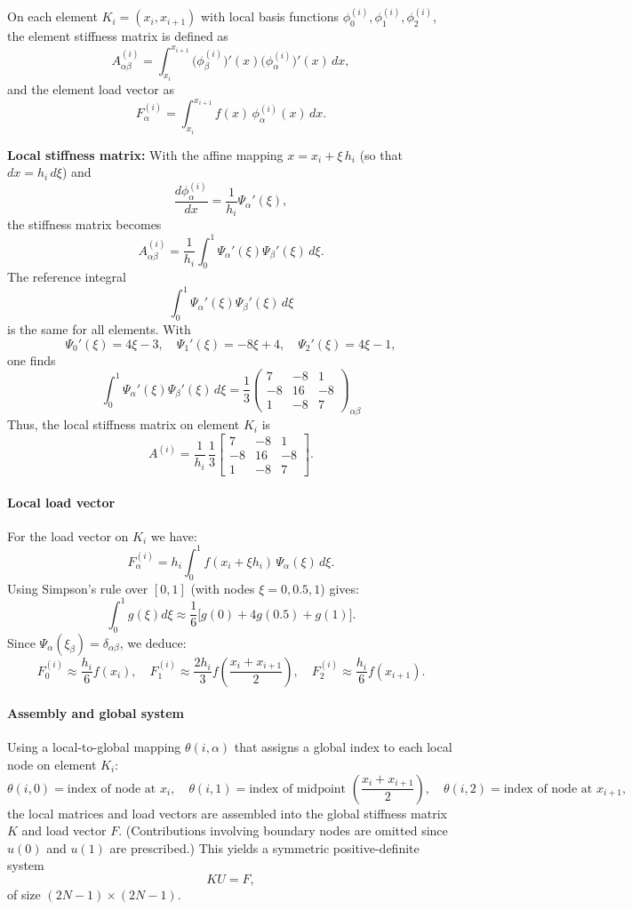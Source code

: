 \documentclass[a4paper,10pt]{report}
\begin{document}
On each element \(K_i=(x_i,x_{i+1})\) with local basis functions \(\phi_0^{(i)},\phi_1^{(i)},\phi_2^{(i)}\), the element stiffness matrix is defined as
\[
	A^{(i)}_{\alpha\beta}=\int_{x_i}^{x_{i+1}} \big(\phi_\beta^{(i)}\big)'(x) \big(\phi_\alpha^{(i)}\big)'(x)\,dx,
\]
and the element load vector as
\[
	F^{(i)}_\alpha=\int_{x_i}^{x_{i+1}} f(x)\,\phi_\alpha^{(i)}(x)\,dx.
\]

\textbf{Local stiffness matrix:} With the affine mapping \(x=x_i+\xi\,h_i\) (so that \(dx=h_i\,d\xi\)) and
\[
	\frac{d\phi_\alpha^{(i)}}{dx}=\frac{1}{h_i}\Psi_\alpha'(\xi),
\]
the stiffness matrix becomes
\[
	A^{(i)}_{\alpha\beta}=\frac{1}{h_i}\int_0^1 \Psi_\alpha'(\xi)\Psi_\beta'(\xi)\,d\xi.
\]
The reference integral
\[
	\int_0^1 \Psi_\alpha'(\xi)\Psi_\beta'(\xi)\,d\xi
\]
is the same for all elements. With
\[
	\Psi_0'(\xi)=4\xi-3,\quad \Psi_1'(\xi)=-8\xi+4,\quad \Psi_2'(\xi)=4\xi-1,
\]
one finds
\[
	\int_0^1 \Psi_\alpha'(\xi)\Psi_\beta'(\xi)\,d\xi = \frac{1}{3}
	\begin{pmatrix}
		7  & -8 & 1  \\[1mm]
		-8 & 16 & -8 \\[1mm]
		1  & -8 & 7
	\end{pmatrix}_{\alpha\beta}
\]
Thus, the local stiffness matrix on element \(K_i\) is
\[
	A^{(i)}=\frac{1}{h_i}\,\frac{1}{3}
	\begin{bmatrix}
		7  & -8 & 1  \\[1mm]
		-8 & 16 & -8 \\[1mm]
		1  & -8 & 7
	\end{bmatrix}.
\]

\paragraph{Local load vector}
For the load vector on \(K_i\) we have:
\[
	F^{(i)}_\alpha=h_i\int_0^1 f(x_i+\xi h_i)\,\Psi_\alpha(\xi)\,d\xi.
\]
Using Simpson's rule over \([0,1]\) (with nodes \(\xi=0,0.5,1\)) gives:
\[
	\int_0^1 g(\xi)d\xi\approx \frac{1}{6}\Big[g(0)+4g(0.5)+g(1)\Big].
\]
Since \(\Psi_\alpha(\xi_\beta)=\delta_{\alpha\beta}\), we deduce:
\[
	F^{(i)}_0\approx \frac{h_i}{6}f(x_i),\quad
	F^{(i)}_1\approx \frac{2h_i}{3}f\!\left(\frac{x_i+x_{i+1}}{2}\right),\quad
	F^{(i)}_2\approx \frac{h_i}{6}f(x_{i+1}).
\]

\paragraph{Assembly and global system}
Using a local-to-global mapping \(\theta(i,\alpha)\) that assigns a global index to each local node on element \(K_i\):
\[
	\theta(i,0) = \text{index of node at } x_i,\quad
	\theta(i,1) = \text{index of midpoint } \left(\frac{x_i+x_{i+1}}{2}\right),\quad
	\theta(i,2) = \text{index of node at } x_{i+1},
\]
the local matrices and load vectors are assembled into the global stiffness matrix \(K\) and load vector \(F\). (Contributions involving boundary nodes are omitted since \(u(0)\) and \(u(1)\) are prescribed.) This yields a symmetric positive-definite system
\[
	KU=F,
\]
of size \((2N-1)\times(2N-1)\).
\end{document}
